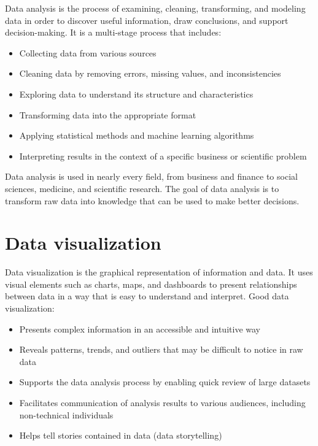 \documentclass[
  english,
  letterpaper,
  DIV=11,
  numbers=noendperiod]{scrreprt}
\providecommand{\tightlist}{%
  \setlength{\itemsep}{0pt}\setlength{\parskip}{0pt}}
\begin{document}
Data analysis is the process of examining, cleaning, transforming, and
modeling data in order to discover useful information, draw conclusions,
and support decision-making. It is a multi-stage process that includes:

\begin{itemize}
\tightlist
\item
  Collecting data from various sources
\item
  Cleaning data by removing errors, missing values, and inconsistencies
\item
  Exploring data to understand its structure and characteristics
\item
  Transforming data into the appropriate format
\item
  Applying statistical methods and machine learning algorithms
\item
  Interpreting results in the context of a specific business or
  scientific problem
\end{itemize}

Data analysis is used in nearly every field, from business and finance
to social sciences, medicine, and scientific research. The goal of data
analysis is to transform raw data into knowledge that can be used to
make better decisions.

\section{Data visualization}\label{data-visualization}

Data visualization is the graphical representation of information and
data. It uses visual elements such as charts, maps, and dashboards to
present relationships between data in a way that is easy to understand
and interpret. Good data visualization:

\begin{itemize}
\tightlist
\item
  Presents complex information in an accessible and intuitive way
\item
  Reveals patterns, trends, and outliers that may be difficult to notice
  in raw data
\item
  Supports the data analysis process by enabling quick review of large
  datasets
\item
  Facilitates communication of analysis results to various audiences,
  including non-technical individuals
\item
  Helps tell stories contained in data (data storytelling)
\end{itemize}
\end{document}
